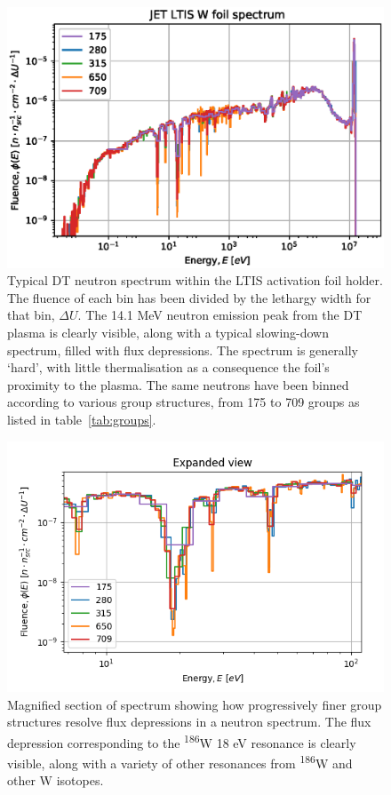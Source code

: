 \begin{figure}[H]
  \centering
  \includegraphics[width=\linewidth]{W186_spectra_diff_groups.eps}
  \caption[Neutron spectrum in LTIS foil holder.]{Typical DT neutron spectrum within the LTIS activation foil holder. The fluence of each bin has been divided by the lethargy width for that bin, $\Delta U$. The 14.1 MeV neutron emission peak from the DT plasma is clearly visible, along with a typical slowing-down spectrum, filled with flux depressions. The spectrum is generally `hard', with little thermalisation as a consequence the foil's proximity to the plasma. The same neutrons have been binned according to various group structures, from 175 to 709 groups as listed in table~\ref{tab:groups}.}
  \label{fig:spectrum}
\end{figure}

\begin{figure}[H]
  \centering
  \includegraphics[width=\linewidth]{w_spectrum_detail}
  \caption[Magnified view of neutron spectrum in LTIS foil holder.]{Magnified section of spectrum showing how progressively finer group structures resolve flux depressions in a neutron spectrum. The flux depression corresponding to the \textsuperscript{186}W 18 eV resonance is clearly visible, along with a variety of other resonances from \textsuperscript{186}W and other W isotopes.}
  \label{fig:spectrum_detail}
\end{figure}

